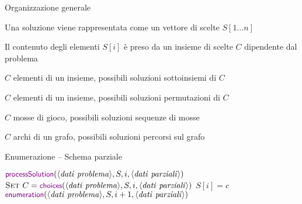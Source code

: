 \begin{frame}{Organizzazione generale}
    
\begin{myboxtitle}
\BI
\item Una soluzione viene rappresentata come un \alert{vettore di scelte $S[1 \ldots n]$} 
\item  Il contenuto degli elementi $S[i]$ è preso da un \alert{insieme di scelte $C$} dipendente dal problema 
\EI
\end{myboxtitle}

\begin{myboxtitle}[Esempi]
\BI
\item $C$ elementi di un insieme, possibili soluzioni \alert{sottoinsiemi} di $C$
\item $C$ elementi di un insieme, possibili soluzioni \alert{permutazioni} di $C$
\item $C$ mosse di gioco, possibili soluzioni \alert{sequenze di mosse}
\item $C$ archi di un grafo, possibili soluzioni \alert{percorsi sul grafo}
\EI
\end{myboxtitle}

\end{frame}


\begin{frame}{Enumerazione -- Schema parziale}

\vspace{-9pt}
\begin{Procedure}
\caption[A]{\textcolor{violet}{\enumerazione}($\langle \mathit{dati\ problema} \rangle$, $\Item[\,]\ S$, \INTEGER\ $i$, $\langle \mathit{dati\ parziali} \rangle)$}
{
  $\textcolor{violet}{\textsf{{\small processSolution}}}(\langle \mathit{dati\ problema} \rangle, S, i, \langle \mathit{dati\ parziali} \rangle)$\;
}
{
  $\textsc{Set}\ C = \textcolor{violet}{\textsf{{\small choices}}}(\langle \mathit{dati\ problema} \rangle, S, i, \langle \mathit{dati\ parziali} \rangle)$\;
  {
    $S[i] = c$\;
    $\textcolor{violet}{\textsf{{\small enumeration}}}(\langle \mathit{dati\ problema} \rangle, S, i+1, \langle \mathit{dati\ parziali} \rangle)$
  }
}
\end{Procedure}

\end{frame}


